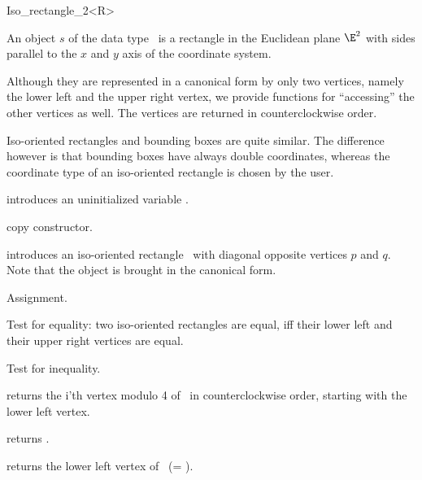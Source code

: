\begin{ccRefClass} {Iso_rectangle_2<R>}

\ccDefinition  An object $s$ of the data type \ccRefName\ is a
rectangle in the Euclidean plane $\E^2$ with sides parallel to the $x$ and
$y$ axis of the coordinate system.
 
Although they are represented in a canonical form by only two
vertices, namely the lower left and the upper right vertex, we provide
functions for ``accessing'' the other vertices as well. The vertices
are returned in counterclockwise order.

Iso-oriented rectangles and bounding boxes are quite similar. The
difference however is that bounding boxes have always double coordinates, 
whereas the coordinate type of an iso-oriented rectangle is chosen by
the user.

\ccCreation
{}


\ccHidden {}
             {introduces an uninitialized variable \ccVar.}

\ccHidden {}
 	    {copy constructor.}

            {introduces an iso-oriented rectangle \ccVar\ with diagonal
             opposite vertices $p$ and $q$. Note that the object is 
             brought in the canonical form.}


\ccOperations
\ccHidden {}
        {Assignment.}

       {Test for equality: two iso-oriented rectangles are equal, iff their
        lower left and their upper right vertices are equal.}

       {Test for inequality.}

       {returns the i'th vertex modulo 4  of \ccVar\ in counterclockwise order, 
        starting with the lower left vertex.}

       {returns  .}

       {returns the lower left vertex of \ccVar\ (= ).}



\end{ccRefClass}
